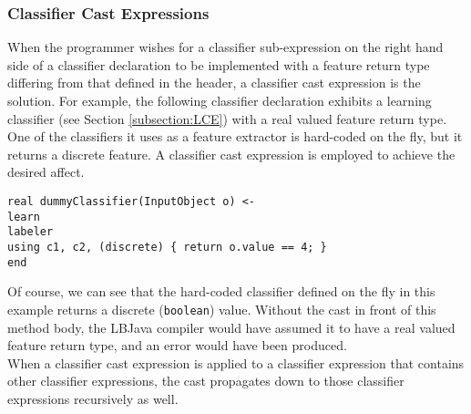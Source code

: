 \subsubsection{Classifier Cast Expressions} \label{subsection:castExpressions}
When the programmer wishes for a classifier sub-expression on the right hand
side of a classifier declaration to be implemented with a feature return type
differing from that defined in the header, a classifier cast expression is the
solution.  For example, the following classifier declaration exhibits a
learning classifier (see Section \ref{subsection:LCE}) with a real valued
feature return type.  One of the classifiers it uses as a feature extractor is
hard-coded on the fly, but it returns a discrete feature.  A classifier cast
expression is employed to achieve the desired affect.

\begin{center}
\begin{algorithm}
    {\tt real dummyClassifier(InputObject o) <-}
\\  {\tt learn} \+
\\  {\tt  labeler}
\\  {\tt  using c1, c2, (discrete) \{ return o.value == 4; \}} \-
\\  {\tt end}
\end{algorithm}
\end{center}

\noindent
Of course, we can see that the hard-coded classifier defined on the fly in
this example returns a discrete ({\tt boolean}) value.  Without the cast in
front of this method body, the LBJava compiler would have assumed it to have a
real valued feature return type, and an error would have been produced. \\

When a classifier cast expression is applied to a classifier expression that
contains other classifier expressions, the cast propagates down to those
classifier expressions recursively as well.

